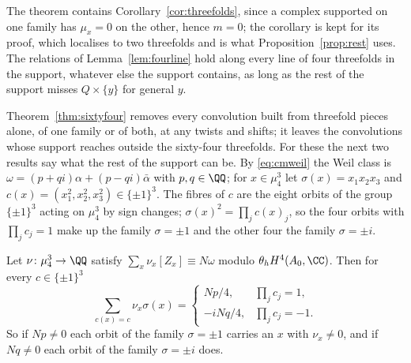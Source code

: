 The theorem contains Corollary~\ref{cor:threefolds}, since a complex supported on one family has $\mu_{x}=0$ on the other, hence $m=0$; the corollary is kept for its proof, which localises to two threefolds and is what Proposition~\ref{prop:rest} uses. The relations of Lemma~\ref{lem:fourline} hold along every line of four threefolds in the support, whatever else the support contains, as long as the rest of the support misses $Q\times\{y\}$ for general $y$.

Theorem~\ref{thm:sixtyfour} removes every convolution built from threefold pieces alone, of one family or of both, at any twists and shifts; it leaves the convolutions whose support reaches outside the sixty-four threefolds. For these the next two results say what the rest of the support can be. By \eqref{eq:cmweil} the Weil class is $\omega=(p+qi)\alpha+(p-qi)\bar\alpha$ with $p,q\in\QQ$; for $x\in\mu_{4}^{3}$ let $\sigma(x)=x_{1}x_{2}x_{3}$ and $c(x)=(x_{1}^{2},x_{2}^{2},x_{3}^{2})\in\{\pm1\}^{3}$. The fibres of $c$ are the eight orbits of the group $\{\pm1\}^{3}$ acting on $\mu_{4}^{3}$ by sign changes; $\sigma(x)^{2}=\prod_{j}c(x)_{j}$, so the four orbits with $\prod_{j}c_{j}=1$ make up the family $\sigma=\pm1$ and the other four the family $\sigma=\pm i$.

\begin{lemma}\label{lem:orbits}
Let $\nu\colon\mu_{4}^{3}\to\QQ$ satisfy $\sum_{x}\nu_{x}[Z_{x}]\equiv N\omega$ modulo $\theta_{h}H^{4}(A_{0},\CC)$. Then for every $c\in\{\pm1\}^{3}$
\[
\sum_{c(x)=c}\nu_{x}\sigma(x)=\begin{cases}Np/4,&\prod_{j}c_{j}=1,\\ -iNq/4,&\prod_{j}c_{j}=-1.\end{cases}
\]
So if $Np\ne0$ each orbit of the family $\sigma=\pm1$ carries an $x$ with $\nu_{x}\ne0$, and if $Nq\ne0$ each orbit of the family $\sigma=\pm i$ does.
\end{lemma}


